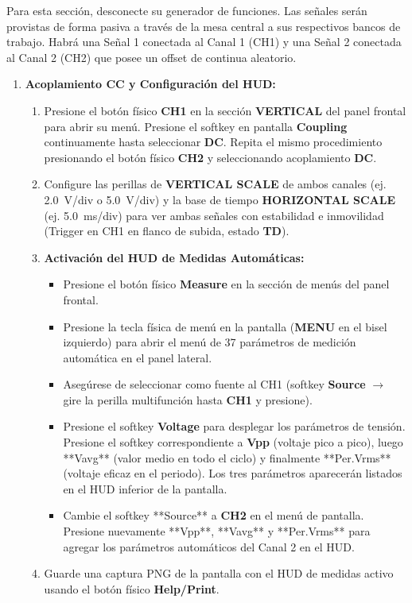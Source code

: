 \documentclass[12pt, letterpaper]{article}
\begin{document}
Para esta sección, desconecte su generador de funciones. Las señales serán provistas de forma pasiva a través de la mesa central a sus respectivos bancos de trabajo. Habrá una Señal 1 conectada al Canal 1 (CH1) y una Señal 2 conectada al Canal 2 (CH2) que posee un offset de continua aleatorio.

\begin{enumerate}[label=\textbf{2.3.\alph*)}]
    \item \textbf{Acoplamiento CC y Configuración del HUD:}
    \begin{enumerate}[label=\roman*.]
        \item Presione el botón físico \textbf{CH1} en la sección \textbf{VERTICAL} del panel frontal para abrir su menú. Presione el softkey en pantalla \textbf{Coupling} continuamente hasta seleccionar \textbf{DC}. Repita el mismo procedimiento presionando el botón físico \textbf{CH2} y seleccionando acoplamiento \textbf{DC}.
        \item Configure las perillas de \textbf{VERTICAL SCALE} de ambos canales (ej. \SI{2.0}{V/div} o \SI{5.0}{V/div}) y la base de tiempo \textbf{HORIZONTAL SCALE} (ej. \SI{5.0}{ms/div}) para ver ambas señales con estabilidad e inmovilidad (Trigger en CH1 en flanco de subida, estado \textbf{TD}).
        \item \textbf{Activación del HUD de Medidas Automáticas:}
        \begin{itemize}
            \item Presione el botón físico \textbf{Measure} en la sección de menús del panel frontal.
            \item Presione la tecla física de menú en la pantalla (\textbf{MENU} en el bisel izquierdo) para abrir el menú de 37 parámetros de medición automática en el panel lateral.
            \item Asegúrese de seleccionar como fuente al CH1 (softkey \textbf{Source} $\rightarrow$ gire la perilla multifunción hasta \textbf{CH1} y presione).
            \item Presione el softkey \textbf{Voltage} para desplegar los parámetros de tensión. Presione el softkey correspondiente a \textbf{Vpp} (voltaje pico a pico), luego **Vavg** (valor medio en todo el ciclo) y finalmente **Per.Vrms** (voltaje eficaz en el periodo). Los tres parámetros aparecerán listados en el HUD inferior de la pantalla.
            \item Cambie el softkey **Source** a \textbf{CH2} en el menú de pantalla. Presione nuevamente **Vpp**, **Vavg** y **Per.Vrms** para agregar los parámetros automáticos del Canal 2 en el HUD.
        \end{itemize}
        \item Guarde una captura PNG de la pantalla con el HUD de medidas activo usando el botón físico \textbf{Help/Print}.
    \end{enumerate}
    

\end{enumerate}
\end{document}
